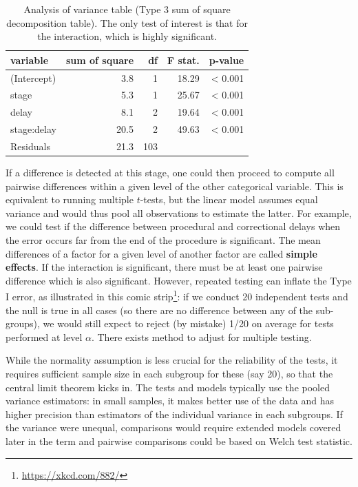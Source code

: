 \documentclass[
  11pt,
  letterpaper,
]{book}
\renewcommand{\href}[2]{#2\footnote{\url{#1}}}
\theoremstyle{definition}
\theoremstyle{definition}
\theoremstyle{definition}
\theoremstyle{definition}
\theoremstyle{remark}
\begin{document}
\begin{table}

\caption{\label{tab:summarydelaywinteraction}Analysis of variance table (Type 3 sum of square decomposition table). The only test of interest is that for the interaction, which is highly significant.}
\centering
\begin{tabular}[t]{lrrrr}
\toprule
variable & sum of square & df & F stat. & p-value\\
\midrule
(Intercept) & 3.8 & 1 & 18.29 & < 0.001\\
stage & 5.3 & 1 & 25.67 & < 0.001\\
delay & 8.1 & 2 & 19.64 & < 0.001\\
stage:delay & 20.5 & 2 & 49.63 & < 0.001\\
Residuals & 21.3 & 103 &  & \\
\bottomrule
\end{tabular}
\end{table}

If a difference is detected at this stage, one could then proceed to compute all pairwise differences within a given level of the other categorical variable. This is equivalent to running multiple \(t\)-tests, but the linear model assumes equal variance and would thus pool all observations to estimate the latter. For example, we could test if the difference between procedural and correctional delays when the error occurs far from the end of the procedure is significant. The mean differences of a factor for a given level of another factor are called \textbf{simple effects}. If the interaction is significant, there must be at least one pairwise difference which is also significant. However, repeated testing can inflate the Type I error, \href{https://xkcd.com/882/}{as illustrated in this comic strip}: if we conduct 20 independent tests and the null is true in all cases (so there are no difference between any of the sub-groups), we would still expect to reject (by mistake) 1/20 on average for tests performed at level \(\alpha\). There exists method to adjust for multiple testing.

While the normality assumption is less crucial for the reliability of the tests, it requires sufficient sample size in each subgroup for these (say 20), so that the central limit theorem kicks in. The tests and models typically use the pooled variance estimators: in small samples, it makes better use of the data and has higher precision than estimators of the individual variance in each subgroups. If the variance were unequal, comparisons would require extended models covered later in the term and pairwise comparisons could be based on Welch test statistic.
\end{document}
